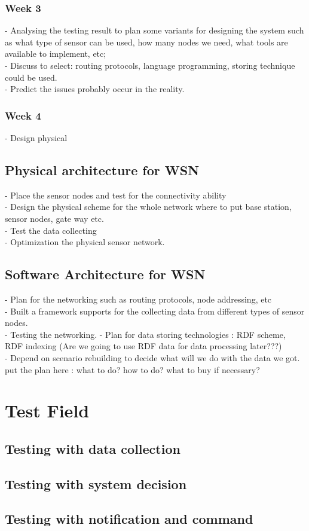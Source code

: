 \documentclass[a4paper, 12pt]{article}
\begin{document}
\subsubsection{Week 3}
- Analysing the testing result to plan some variants for designing the system such as  what type of sensor can be used, how many nodes we need, what tools are available to implement, etc;\\
- Discuss to select: routing protocols, language programming, storing technique could be used.\\
- Predict the issues probably occur in the reality.
\subsubsection{Week 4}
- Design physical 




\subsection{Physical architecture for WSN}
- Place the sensor nodes and test for the connectivity ability\\
- Design the physical scheme for the whole network where to put base station, sensor nodes, gate way etc.\\
- Test the data collecting\\
- Optimization the physical sensor network.
\subsection{Software Architecture for WSN}
- Plan for the networking such as routing protocols, node addressing, etc \\
- Built a framework supports for the collecting data from different types of sensor nodes.\\
- Testing the networking.
- Plan for data storing technologies : RDF scheme, RDF indexing (Are we going to use RDF data for data processing later???)\\ 
- Depend on scenario rebuilding to decide what will we do with the data we got.\\
put the plan here : what to do? how to do? what to buy if necessary?
\section{Test Field}
\subsection{Testing with data collection}
\subsection{Testing with system decision}
\subsection{Testing with notification and command}
\end{document}
